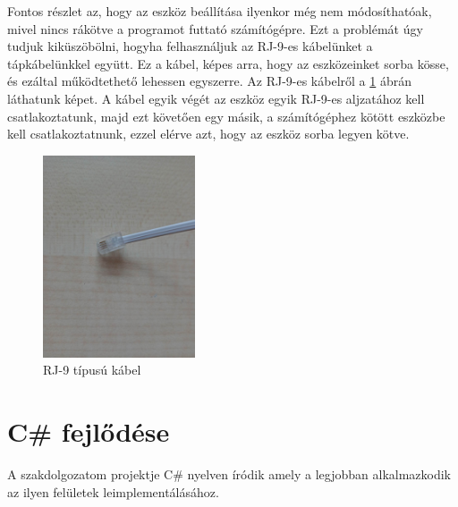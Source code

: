 \documentclass[tocnopagenum]{thesis-ekf}
\theoremstyle{definition}
\theoremstyle{remark}
\begin{document}
	Fontos részlet az, hogy az eszköz beállítása ilyenkor még nem módosíthatóak, mivel nincs rákötve a programot futtató számítógépre. Ezt a problémát úgy tudjuk kiküszöbölni, hogyha felhasználjuk az RJ-9-es kábelünket a tápkábelünkkel együtt. Ez a kábel, képes arra, hogy az eszközeinket sorba kösse, és ezáltal működtethető lehessen egyszerre.
	Az RJ-9-es kábelről a \ref{fig:rj9_kabel} ábrán láthatunk képet. A kábel egyik végét az eszköz egyik RJ-9-es aljzatához kell csatlakoztatunk, majd ezt követően egy másik, a számítógéphez kötött eszközbe kell csatlakoztatnunk, ezzel elérve azt, hogy az eszköz sorba legyen kötve.
	\begin{figure}[H]	
		\centering
		\includegraphics[page=1,width=0.4\textwidth]{rj9_kabel}
		\caption[RJ-9 típusú kábel]{RJ-9 típusú kábel}
		\label{fig:rj9_kabel}
	\end{figure}
\newpage
	\section{C\# fejlődése}
	A szakdolgozatom projektje C\# nyelven íródik amely a legjobban alkalmazkodik az ilyen felületek leimplementálásához. 
	
\end{document}
